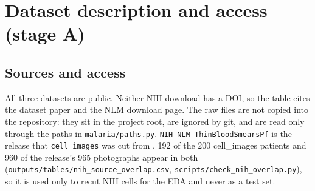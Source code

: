 \documentclass[11pt,a4paper]{article}
\begin{document}
\section{Dataset description and access (stage A)}

\subsection{Sources and access}

All three datasets are public. Neither NIH download has a DOI, so the table cites the dataset paper and the NLM download page. The raw files are not copied into the repository: they sit in the project root, are ignored by git, and are read only through the paths in \href{https://github.com/noahtjonsk/malaria-cross-dataset/blob/main/malaria/paths.py}{\texttt{malaria/\allowbreak{}paths.\allowbreak{}py}}. \texttt{NIH-NLM-ThinBloodSmearsPf} is the release that \texttt{cell\_\allowbreak{}images} was cut from \citep{kassim2021}. 192 of the 200 cell\_\allowbreak{}images patients and 960 of the release's 965 photographs appear in both (\href{https://github.com/noahtjonsk/malaria-cross-dataset/blob/main/outputs/tables/nih_source_overlap.csv}{\texttt{outputs/\allowbreak{}tables/\allowbreak{}nih\_\allowbreak{}source\_\allowbreak{}overlap.\allowbreak{}csv}}, \href{https://github.com/noahtjonsk/malaria-cross-dataset/blob/main/scripts/check_nih_overlap.py}{\texttt{scripts/\allowbreak{}check\_\allowbreak{}nih\_\allowbreak{}overlap.\allowbreak{}py}}), so it is used only to recut NIH cells for the EDA and never as a test set.
\end{document}
